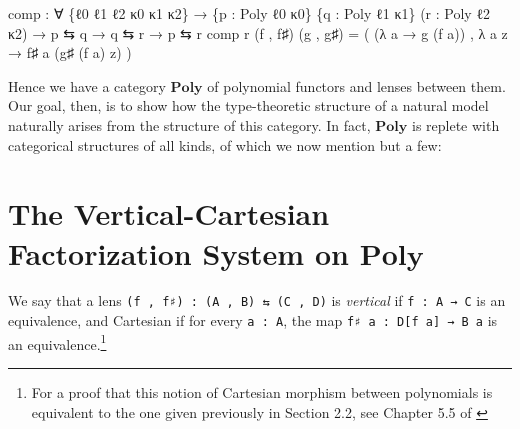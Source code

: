 \documentclass[
  11pt,
  oneside,
  article]{memoir}
\newenvironment{Shaded}{}{}
\newcommand{\NormalTok}[1]{#1}
\newcommand{\OtherTok}[1]{\textcolor[rgb]{0.00,0.44,0.13}{#1}}
\theoremstyle{definition}
\theoremstyle{plain}
\newcommand{\0}{\textsf{0}}
\newcommand{\1}{\tn{\textsf{1}}}
\begin{document}
\begin{Shaded}
\begin{Highlighting}[]
\NormalTok{comp }\OtherTok{:} \OtherTok{∀} \OtherTok{\{}\NormalTok{ℓ0 ℓ1 ℓ2 κ0 κ1 κ2}\OtherTok{\}}
       \OtherTok{→} \OtherTok{\{}\NormalTok{p }\OtherTok{:}\NormalTok{ Poly ℓ0 κ0}\OtherTok{\}} \OtherTok{\{}\NormalTok{q }\OtherTok{:}\NormalTok{ Poly ℓ1 κ1}\OtherTok{\}} \OtherTok{(}\NormalTok{r }\OtherTok{:}\NormalTok{ Poly ℓ2 κ2}\OtherTok{)}
       \OtherTok{→}\NormalTok{ p ⇆ q }\OtherTok{→}\NormalTok{ q ⇆ r }\OtherTok{→}\NormalTok{ p ⇆ r}
\NormalTok{comp r }\OtherTok{(}\NormalTok{f , f♯}\OtherTok{)} \OtherTok{(}\NormalTok{g , g♯}\OtherTok{)} \OtherTok{=} 
     \OtherTok{(} \OtherTok{(λ}\NormalTok{ a }\OtherTok{→}\NormalTok{ g }\OtherTok{(}\NormalTok{f a}\OtherTok{))}\NormalTok{ , }\OtherTok{λ}\NormalTok{ a z }\OtherTok{→}\NormalTok{ f♯ a }\OtherTok{(}\NormalTok{g♯ }\OtherTok{(}\NormalTok{f a}\OtherTok{)}\NormalTok{ z}\OtherTok{)} \OtherTok{)}
\end{Highlighting}
\end{Shaded}

Hence we have a category \(\mathbf{Poly}\) of polynomial functors and
lenses between them. Our goal, then, is to show how the type-theoretic
structure of a natural model naturally arises from the structure of this
category. In fact, \(\mathbf{Poly}\) is replete with categorical
structures of all kinds, of which we now mention but a few:

\section{\texorpdfstring{The Vertical-Cartesian Factorization System on
\(\mathbf{Poly}\)}{The Vertical-Cartesian Factorization System on \textbackslash mathbf\{Poly\}}}\label{the-vertical-cartesian-factorization-system-on-mathbfpoly}

We say that a lens \texttt{(f\ ,\ f♯)\ :\ (A\ ,\ B)\ ⇆\ (C\ ,\ D)} is
\emph{vertical} if \texttt{f\ :\ A\ →\ C} is an equivalence, and
Cartesian if for every \texttt{a\ :\ A}, the map
\texttt{f♯\ a\ :\ D{[}f\ a{]}\ →\ B\ a} is an
equivalence.\footnote{For a proof that this notion of Cartesian morphism between polynomials is equivalent to the one given previously in Section 2.2, see Chapter 5.5 of \cite{spivak2022poly}}
\end{document}

